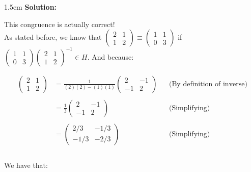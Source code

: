 \documentclass{article}
\newenvironment{solution}{
	\vspace{.5em}
	\par
	\begin{adjustwidth}{1.5em}{}
	\textbf{{Solution:}}
	\par
	\vspace{.5em}
}{
	\vspace{1em}
	\end{adjustwidth}
	\setcounter{step}{0}
}
\newcounter{step}
\begin{document}
\begin{solution}
	This congruence is actually correct! \\

	As stated before, we know that $\begin{pmatrix} 2 & 1 \\ 1 & 2 \end{pmatrix} \equiv \begin{pmatrix} 1 & 1 \\ 0 & 3 \end{pmatrix}$ if $\begin{pmatrix} 1 & 1 \\ 0 & 3 \end{pmatrix}\begin{pmatrix} 2 & 1 \\ 1 & 2 \end{pmatrix}^{-1} \in H$. And because:

	\begin{align*}
		\begin{pmatrix}
			2 & 1 \\
			1 & 2
		\end{pmatrix}
		&= \frac{1}{(2)(2) - (1)(1)}
		\begin{pmatrix}
			2 & -1 \\
			-1 & 2
		\end{pmatrix}
		&&\text{(By definition of inverse)} \\\\
		&= \frac{1}{3}\begin{pmatrix}
			2 & -1 \\
			-1 & 2
		\end{pmatrix}
		&&\text{(Simplifying)} \\\\
		&= \begin{pmatrix}
			2/3 & -1/3 \\
			-1/3 & -2/3
		\end{pmatrix}
		&&\text{(Simplifying)} \\\\
	\end{align*}

	We have that:


\end{solution}
\end{document}
